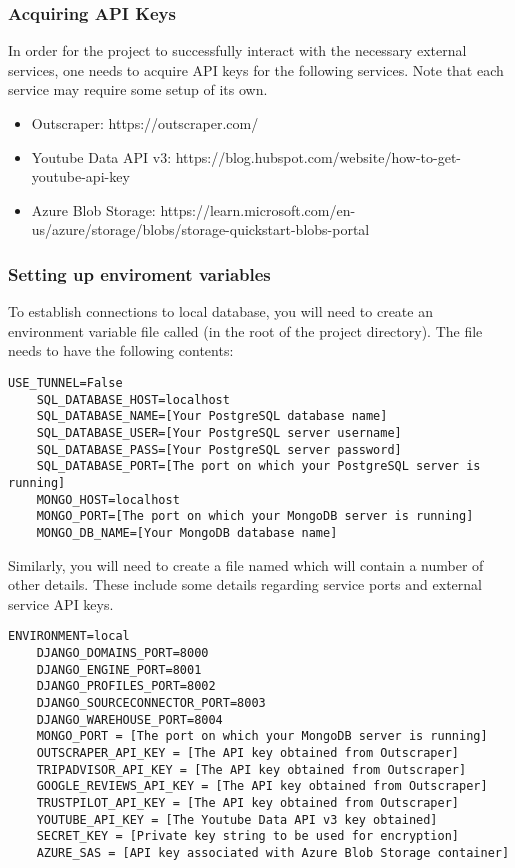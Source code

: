 \documentclass[12pt]{article}
\begin{document}
\subsubsection{Acquiring API Keys}
In order for the project to successfully interact with the necessary external services, one needs to acquire API keys for the following services.
Note that each service may require some setup of its own.
\begin{itemize}
    \item Outscraper: https://outscraper.com/
    \item Youtube Data API v3: https://blog.hubspot.com/website/how-to-get-youtube-api-key
    \item Azure Blob Storage: https://learn.microsoft.com/en-us/azure/storage/blobs/storage-quickstart-blobs-portal
\end{itemize}


\subsubsection{Setting up enviroment variables}
To establish connections to local database, you will need to create an environment variable file called  (in the root of the project directory). The file
needs to have the following contents:
\begin{lstlisting}[basicstyle=\ttfamily]
    USE_TUNNEL=False
    SQL_DATABASE_HOST=localhost
    SQL_DATABASE_NAME=[Your PostgreSQL database name]
    SQL_DATABASE_USER=[Your PostgreSQL server username]
    SQL_DATABASE_PASS=[Your PostgreSQL server password]
    SQL_DATABASE_PORT=[The port on which your PostgreSQL server is running]
    MONGO_HOST=localhost
    MONGO_PORT=[The port on which your MongoDB server is running]
    MONGO_DB_NAME=[Your MongoDB database name]
\end{lstlisting}

Similarly, you will need to create a file named  which will contain a number of other details. These include some details
regarding service ports and external service API keys.
\begin{lstlisting}[basicstyle=\ttfamily]
    ENVIRONMENT=local
    DJANGO_DOMAINS_PORT=8000
    DJANGO_ENGINE_PORT=8001
    DJANGO_PROFILES_PORT=8002
    DJANGO_SOURCECONNECTOR_PORT=8003
    DJANGO_WAREHOUSE_PORT=8004
    MONGO_PORT = [The port on which your MongoDB server is running]
    OUTSCRAPER_API_KEY = [The API key obtained from Outscraper]
    TRIPADVISOR_API_KEY = [The API key obtained from Outscraper]
    GOOGLE_REVIEWS_API_KEY = [The API key obtained from Outscraper]
    TRUSTPILOT_API_KEY = [The API key obtained from Outscraper]
    YOUTUBE_API_KEY = [The Youtube Data API v3 key obtained]
    SECRET_KEY = [Private key string to be used for encryption]
    AZURE_SAS = [API key associated with Azure Blob Storage container]
\end{lstlisting}
\end{document}
